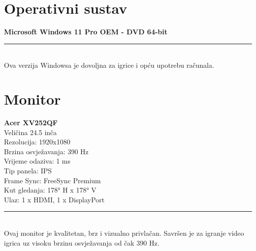 \documentclass{article}
\begin{document}
\section{Operativni sustav}
\textbf{Microsoft Windows 11 Pro OEM - DVD 64-bit}
\\ \rule{\textwidth}{0.5pt}
\\ Ova verzija Windowsa je dovoljna za igrice i opću upotrebu računala.

\section{Monitor}
\textbf{Acer XV252QF}
\\ Veličina 24.5 inča
\\ Rezolucija: 1920x1080
\\ Brzina osvježavanja: 390 Hz
\\ Vrijeme odaziva: 1 ms
\\ Tip panela: IPS
\\ Frame Sync: FreeSync Premium
\\ Kut gledanja: 178° H x 178° V
\\ Ulaz: 1 x HDMI, 1 x DisplayPort
\\ \rule{\textwidth}{0.5pt}
\\ Ovaj monitor je kvalitetan, brz i vizualno privlačan. Savršen je za igranje video igrica uz visoku brzinu osvježavanja od čak 390 Hz.
\end{document}
